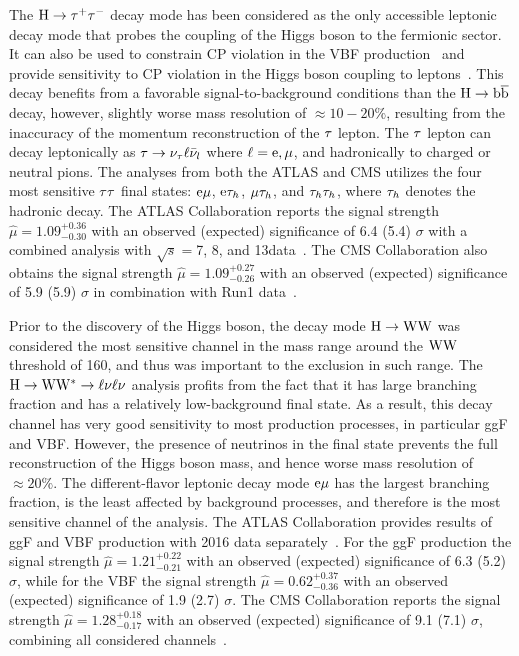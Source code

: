 The $\mathrm{H}\to\tau^{+}\tau^{-}$ decay mode has been considered as the only accessible leptonic decay mode that probes the coupling of the Higgs boson to the fermionic sector. It can also be used to constrain CP violation in the VBF production~\cite{Aad:2016nal} and provide sensitivity to CP violation in the Higgs boson coupling to leptons~\cite{Berge:2015nua}. This decay benefits from a favorable signal-to-background conditions than the $\mathrm{H}\to \mathrm{b}\overline{\mathrm{b}}$ decay, however, slightly worse mass resolution of $\approx 10 - 20\%$, resulting from the inaccuracy of the momentum reconstruction of the $\tau$ lepton. The $\tau$ lepton can decay leptonically as $\tau\to\nu_{\tau}\ell\bar{\nu}_{l}$ where $\ell=\mathrm{e}, \mu$, and hadronically to charged or neutral pions. The analyses from both the ATLAS and CMS utilizes the four most sensitive $\tau\tau$ final states: $\mathrm{e}\mu$, $\mathrm{e}\tau_{h}$, $\mu\tau_{h}$, and $\tau_{h}\tau_{h}$, where $\tau_{h}$ denotes the hadronic decay. The ATLAS Collaboration reports the signal strength $\hat{\mu}=1.09^{+0.36}_{-0.30}$ with an observed (expected) significance of 6.4 (5.4) $\sigma$ with a combined analysis with $\sqrt{s}=$7, 8, and 13\TeV data~\cite{ATLAS-CONF-2018-021}. The CMS Collaboration also obtains the signal strength $\hat{\mu}=1.09^{+0.27}_{-0.26}$ with an observed (expected) significance of 5.9 (5.9) $\sigma$ in combination with Run1 data~\cite{Sirunyan:2017khh}.

Prior to the discovery of the Higgs boson, the decay mode $\mathrm{H}\to\mathrm{W}\mathrm{W}$ was considered the most sensitive channel in the mass range around the $\mathrm{W}\mathrm{W}$ threshold of 160\GeV, and thus was important to the exclusion in such range. The $\mathrm{H}\to\mathrm{W}\mathrm{W}^{*}\to\ell\nu\ell\nu$ analysis profits from the fact that it has large branching fraction and has a relatively low-background final state. As a result, this decay channel has very good sensitivity to most production processes, in particular ggF and VBF. However, the presence of neutrinos in the final state prevents the full reconstruction of the Higgs boson mass, and hence worse mass resolution of $\approx 20\%$. The different-flavor leptonic decay mode $\mathrm{e}\mu$ has the largest branching fraction, is the least affected by background processes, and therefore is the most sensitive channel of the analysis. The ATLAS Collaboration provides results of ggF and VBF production with 2016 data separately~\cite{ATLAS-CONF-2018-004}. For the ggF production the signal strength $\hat{\mu}=1.21^{+0.22}_{-0.21}$ with an observed (expected) significance of 6.3 (5.2) $\sigma$, while for the VBF the signal strength $\hat{\mu}=0.62^{+0.37}_{-0.36}$ with an observed (expected) significance of 1.9 (2.7) $\sigma$. The CMS Collaboration reports the signal strength $\hat{\mu}=1.28^{+0.18}_{-0.17}$ with an observed (expected) significance of 9.1 (7.1) $\sigma$, combining all considered channels~\cite{Sirunyan:2018egh}.

